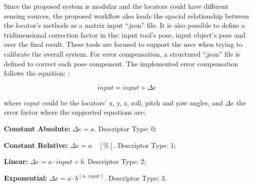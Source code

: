 
Since the proposed system is modular and the locators could have different sensing sources, the proposed workflow also loads the spacial relationship between the locator's methods as a matrix input ``.json'' file. It is also possible to define a tridimensional correction factor in the: input tool's pose, input object's pose and over the final result. These tools are focused to support the user when trying to calibrate the overall system. For error compensation, a structured ``.json'' file is defined to correct each pose component. The implemented error compensation follows the equation: : 

\begin{equation}
	input = input + \Delta e
\end{equation} 

\noindent where $input$ could be the locators' x, y, z, roll, pitch and yaw angles, and $\Delta e$ the error factor where the supported equations are:

\begin{itemize_jp}
	\item \textbf{Constant Absolute:} $\Delta e = a$. Descriptor Type: 0;
	\item \textbf{Constant Relative:} $\Delta e = a\quad[\%]$. Descriptor Type: 1;
	\item \textbf{Linear:} $\Delta e = a \cdot input + b$. Descriptor Type: 2;
	\item \textbf{Exponential:} $\Delta e = a \cdot b ^{(\alpha \cdot input)}$. Descriptor Type: 3. 
\end{itemize_jp} 

